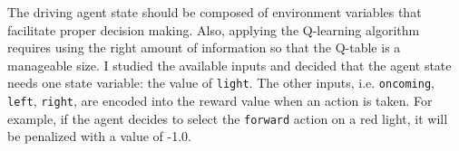 \documentclass[12pt,letterpaper]{article}
\renewenvironment{itemize}{
  \begin{list}{}{
    \setlength{\leftmargin}{1.5em}
  }
}{
  \end{list}
}
\begin{document}
The driving agent state should be composed of environment variables that facilitate proper decision making.
Also, applying the Q-learning algorithm requires using the right amount of information so that the Q-table is a manageable size.
I studied the available inputs and decided that the agent state needs one state variable: the value of \verb|light|.
The other inputs, i.e. \verb|oncoming|, \verb|left|, \verb|right|, are encoded into the reward value when an action is taken.
For example, if the agent decides to select the \verb|forward| action on a red light, it will be penalized with a value of -1.0.
\end{document}

